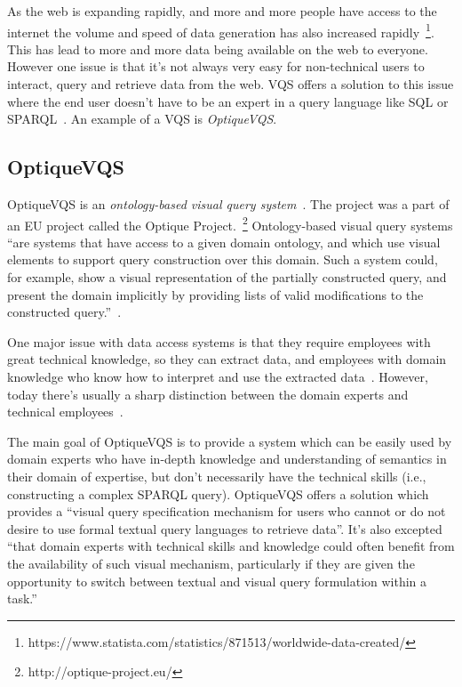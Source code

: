 \documentclass[a4paper,english]{ifimaster/ifimaster}
\begin{document}
As the web is expanding rapidly, and more and more people have access to the internet the volume and speed of data generation has also increased rapidly~\footnote{https://www.statista.com/statistics/871513/worldwide-data-created/}. This has lead to more and more data being available on the web to everyone. However one issue is that it's not always very easy for non-technical users to interact, query and retrieve data from the web. VQS offers a solution to this issue where the end user doesn’t have to be an expert in a query language like SQL or SPARQL~\cite{VQS_on_the_web}. An example of a VQS is \textit{OptiqueVQS}. 


\subsection{OptiqueVQS}

OptiqueVQS is an \textit{ontology-based visual query system}~\cite{OptiqueVQS_swj_article}. The project was a part of an EU project called the Optique Project.~\footnote{http://optique-project.eu/} Ontology-based visual query systems ``are systems that have access to a given domain ontology, and which use visual elements to support query construction over this domain. Such a system could, for example, show a visual representation of the partially constructed query, and present the domain implicitly by providing lists of valid modifications to the constructed query.''~\cite{vidar-phd-2020}.

One major issue with data access systems is that they require employees with great technical knowledge, so they can extract data, and employees with domain knowledge who know how to interpret and use the extracted data~\cite{VQS_search}. However, today there's usually a sharp distinction between the domain experts and technical employees~\cite{VQS_search}.

The main goal of OptiqueVQS is to provide a system which can be easily used by domain experts who have in-depth knowledge and understanding of semantics in their domain of expertise, but don't necessarily have the technical skills (i.e., constructing a complex SPARQL query). 
OptiqueVQS offers a solution which provides a ``visual query specification mechanism for users who cannot or do not desire to use formal textual query languages to retrieve data''. It's also excepted ``that domain experts with technical skills and knowledge could often benefit from the availability of such visual mechanism, particularly if they are given the opportunity to switch between textual and visual query formulation within a task.''~\cite{OptiqueVQS_swj_article}
\end{document}
